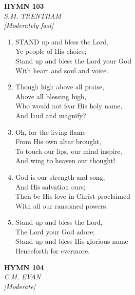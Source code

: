 \newpage
\begin{center}
    {\Large \textbf{HYMN 103}}
    \\
    \textit{S.M. TRENTHAM}
    \\
    \textit{\small [Moderately fast]}
\end{center}
\vspace{1em}

\begin{enumerate}
    \item STAND up and bless the Lord, \\
        Ye people of His choice; \\
        Stand up and bless the Lord your God \\
        With heart and soul and voice.

    \item Though high above all praise, \\
        Above all blessing high, \\
        Who would not fear His holy name, \\
        And laud and magnify?

    \item Oh, for the living flame \\
        From His own altar brought, \\
        To touch our lips, our mind inspire, \\
        And wing to heaven our thought!

    \item God is our strength and song, \\
        And His salvation ours; \\
        Then be His love in Christ proclaimed \\
        With all our ransomed powers.

    \item Stand up and bless the Lord, \\
        The Lord your God adore; \\
        Stand up and bless His glorious name \\
        Henceforth for evermore.

\end{enumerate}

\newpage
\begin{center}
    {\Large \textbf{HYMN 104}}
    \\
    \textit{C.M. EVAN}
    \\
    \textit{\small [Moderate]}
\end{center}
\vspace{1em}

